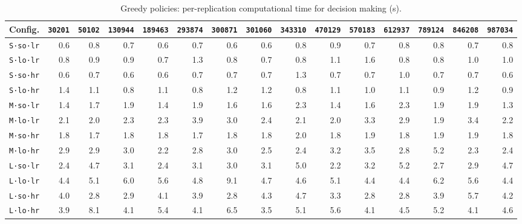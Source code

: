 \begin{table}[htb]
\centering
\small
\caption{Greedy policies: per-replication computational time for decision making (s).}
\label{tab:app_time_opt_false}
\begin{tabular}{@{}lrrrrrrrrrrrrrr@{}}
\toprule
\textbf{Config.} & \texttt{30201} & \texttt{50102} & \texttt{130944} & \texttt{189463} & \texttt{293874} & \texttt{300871} & \texttt{301060} & \texttt{343310} & \texttt{470129} & \texttt{570183} & \texttt{612937} & \texttt{789124} & \texttt{846208} & \texttt{987034} \\
\midrule
\texttt{S·so·lr} & 0.6 & 0.8 & 0.7 & 0.6 & 0.7 & 0.6 & 0.6 & 0.8 & 0.9 & 0.7 & 0.8 & 0.8 & 0.7 & 0.8 \\
\texttt{S·lo·lr} & 0.8 & 0.9 & 0.9 & 0.7 & 1.3 & 0.8 & 0.7 & 0.8 & 1.1 & 1.6 & 0.8 & 0.8 & 1.0 & 1.0 \\
\texttt{S·so·hr} & 0.6 & 0.7 & 0.6 & 0.6 & 0.7 & 0.7 & 0.7 & 1.3 & 0.7 & 0.7 & 1.0 & 0.7 & 0.7 & 0.6 \\
\texttt{S·lo·hr} & 1.4 & 1.1 & 0.8 & 1.1 & 0.8 & 1.2 & 1.2 & 0.8 & 1.1 & 1.0 & 1.1 & 0.9 & 1.2 & 0.9 \\
\texttt{M·so·lr} & 1.4 & 1.7 & 1.9 & 1.4 & 1.9 & 1.6 & 1.6 & 2.3 & 1.4 & 1.6 & 2.3 & 1.9 & 1.9 & 1.3 \\
\texttt{M·lo·lr} & 2.1 & 2.0 & 2.3 & 2.3 & 3.9 & 3.0 & 2.4 & 2.1 & 2.0 & 3.3 & 2.9 & 1.9 & 3.4 & 2.2 \\
\texttt{M·so·hr} & 1.8 & 1.7 & 1.8 & 1.8 & 1.7 & 1.8 & 1.8 & 2.0 & 1.8 & 1.9 & 1.8 & 1.9 & 1.9 & 1.8 \\
\texttt{M·lo·hr} & 2.9 & 2.9 & 3.0 & 2.2 & 2.8 & 3.0 & 2.5 & 2.4 & 3.2 & 3.5 & 2.8 & 5.2 & 2.3 & 2.4 \\
\texttt{L·so·lr} & 2.4 & 4.7 & 3.1 & 2.4 & 3.1 & 3.0 & 3.1 & 5.0 & 2.2 & 3.2 & 5.2 & 2.7 & 2.9 & 4.7 \\
\texttt{L·lo·lr} & 4.4 & 5.1 & 6.0 & 5.6 & 4.8 & 9.1 & 4.7 & 4.6 & 5.1 & 4.4 & 4.4 & 6.2 & 5.6 & 4.4 \\
\texttt{L·so·hr} & 4.0 & 2.8 & 2.9 & 4.1 & 3.9 & 2.8 & 4.3 & 4.7 & 3.3 & 2.8 & 2.8 & 3.9 & 5.7 & 4.2 \\
\texttt{L·lo·hr} & 3.9 & 8.1 & 4.1 & 5.4 & 4.1 & 6.5 & 3.5 & 5.1 & 5.6 & 4.1 & 4.5 & 5.2 & 4.1 & 4.6 \\
\bottomrule
\end{tabular}
\end{table}
